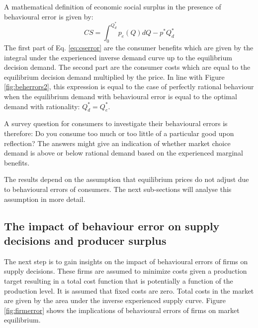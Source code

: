 \documentclass[
]{book}
\begin{document}
A mathematical definition of economic social surplus in the presence of behavioural error is given by:
\begin{equation}
CS = \int_0^{Q_d^*} p_e(Q)dQ - p^*Q_d^*
\label{eq:cserror}
\end{equation}
The first part of Eq. \eqref{eq:cserror} are the consumer benefits which are given by the integral under the experienced inverse demand curve up to the equilibrium decision demand. The second part are the consumer costs which are equal to the equilibrium decision demand multiplied by the price. In line with Figure \ref{fig:beherrors2}, this expression is equal to the case of perfectly rational behaviour when the equilibrium demand with behavioural error is equal to the optimal demand with rationality: \(Q_d^* = Q^*_e\).

A survey question for consumers to investigate their behavioural errors is therefore: Do you consume too much or too little of a particular good upon reflection? The answers might give an indication of whether market choice demand is above or below rational demand based on the experienced marginal benefits.

The results depend on the assumption that equilibrium prices do not adjust due to behavioural errors of consumers. The next sub-sections will analyse this assumption in more detail.

\hypertarget{the-impact-of-behaviour-error-on-supply-decisions-and-producer-surplus}{%
\subsection{The impact of behaviour error on supply decisions and producer surplus}\label{the-impact-of-behaviour-error-on-supply-decisions-and-producer-surplus}}

The next step is to gain insights on the impact of behavioural errors of firms on supply decisions. These firms are assumed to minimize costs given a production target resulting in a total cost function that is potentially a function of the production level. It is assumed that fixed costs are zero. Total costs in the market are given by the area under the inverse experienced supply curve. Figure \ref{fig:firmerror} shows the implications of behavioural errors of firms on market equilibrium.
\end{document}
